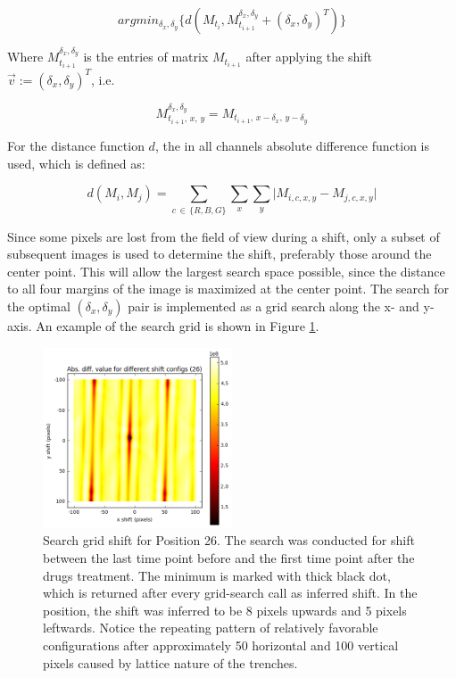 \documentclass[pdftex,12pt,a4paper]{report}
\begin{document}
$$
argmin_{\delta_x, \delta_y} \{d(M_{t_i}, M_{t_{i+1}}^{\delta_x, \delta_y} + (\delta_x, \delta_y)^T)\}
$$

Where $M_{t_{i+1}}^{\delta_x, \delta_y}$ is the entries of matrix $M_{t_{i+1}}$ after applying the shift $\vec{v} := (\delta_x, \delta_y)^T$, i.e.

$$M_{t_{i+1}, \, x, \, y}^{\delta_x, \delta_y} = M_{t_{i+1}, \, x - \delta_x, \, y - \delta_y}$$

For the distance function $d$, the in all channels absolute difference function is used, which is defined as:

$$
d(M_i, M_j) = \sum_{c \, \in \, \{R, B, G\}} \sum_{x} \sum_{y} \vert M_{i, c, x, y} - M_{j, c, x, y} \vert
$$


Since some pixels are lost from the field of view during a shift, only a subset of subsequent images is used to determine the shift, preferably those around the center point. This will allow the largest search space possible, since the distance to all four margins of the image is maximized at the center point. The search for the optimal $(\delta_x, \delta_y)$ pair is implemented as a grid search along the x- and y-axis. An example of the search grid is shown in Figure \ref{fig:searchgrid}.\\

\begin{figure}[H]
\centering
\includegraphics[width=0.5\textwidth]{images/search_grid}
\caption{Search grid shift for Position 26. The search was conducted for shift between the last time point before and the first time point after the drugs treatment. The minimum is marked with thick black dot, which is returned after every grid-search call as inferred shift. In the position, the shift was inferred to be 8 pixels upwards and 5 pixels leftwards. Notice the repeating pattern of relatively favorable configurations after approximately 50 horizontal and 100 vertical pixels caused by lattice nature of the trenches.}
\label{fig:searchgrid}
\end{figure}
\end{document}
